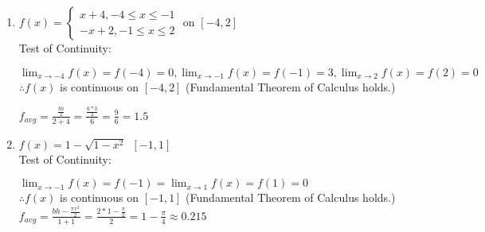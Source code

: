 \documentclass[10pt, letterpaper]{report}
\begin{document}
\begin{enumerate}
{	What is the average value of $f(x)$ for $1\leq x\leq 8$?} \\

    Because average values for each interval are valid, we can assume the Fundamental Theorem of \\ Calculus holds. \\

    $\int_{1}^{8}{f(x)}\,dx=
    \int_{1}^{6}{f(x)}\,dx+\int_{8}^{6}{f(x)}\,dx=
    4*(6-1)+5*(8-6)=10=30$ \\

    $f_{avg}=\frac{\int_{1}^{8}{f(x)}\,dx}{8-1}=\frac{30}{7}$ \\

\pagebreak
  \par In problems 10-11, find the average value of the function on the given integral without integrating.
  \par Hint: Use Geometry. (No calculator)
  \item{$f(x)=\begin{cases}
    	x+4, -4\leq x\leq -1 \\
        -x+2, -1\leq x\leq 2
    \end{cases}$ on $[-4,2]$} \\

    Test of Continuity:

    $\lim_{x\to -4}f(x)=f(-4)=0,
    \lim_{x\to -1}f(x)=f(-1)=3,
    \lim_{x\to 2}f(x)=f(2)=0$ \\
    $\therefore f(x)$ is continuous on $[-4,2]$ (Fundamental Theorem of Calculus holds.)

    $f_{avg}=\frac{\frac{bh}{2}}{2+4}=
    \frac{\frac{6*3}{2}}{6}=
    \frac{9}{6}=1.5$ \\

  \item{$f(x)=1-\sqrt{1-x^{2}}\,\,\,[-1,1]$} \\

    Test of Continuity:

    $\lim_{x\to -1}f(x)=f(-1)=
    \lim_{x\to 1}f(x)=f(1)=0$\\
    $\therefore f(x)$ is continuous on $[-1,1]$ (Fundamental Theorem of Calculus holds.) \\

    $f_{avg}=\frac{bh-\frac{\pi\,r^2}{2}}{1+1}=
    \frac{2*1-\frac{\pi}{2}}{2}=
    1-\frac{\pi}{4}\approx0.215$

\end{enumerate}
\end{document}
